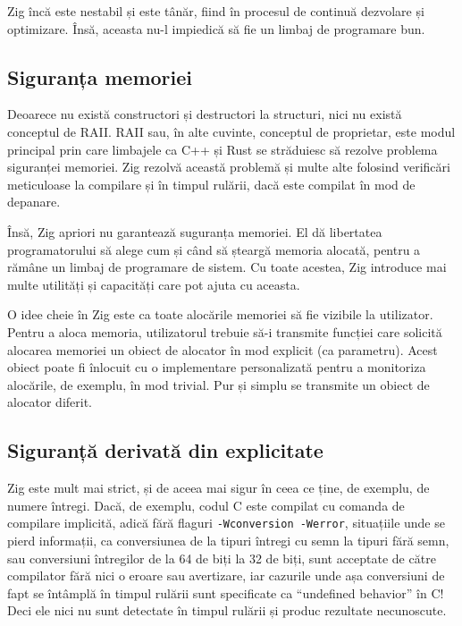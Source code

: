 \documentclass[a4paper,12pt]{report}
\begin{document}
Zig încă este nestabil și este tânăr, fiind în procesul de continuă dezvolare și optimizare.
Însă, aceasta nu-l impiedică să fie un limbaj de programare bun.

\subsection{Siguranța memoriei}

Deoarece nu există constructori și destructori la structuri,
nici nu există conceptul de \ac{RAII}.
\ac{RAII} sau, în alte cuvinte, conceptul de proprietar, este modul principal
prin care limbajele ca C++ și Rust se străduiesc să rezolve problema siguranței memoriei.
Zig rezolvă această problemă și multe alte folosind verificări meticuloase
la compilare și în timpul rulării, dacă este compilat în mod de depanare.

Însă, Zig apriori nu garantează suguranța memoriei.
El dă libertatea programatorului să alege cum și când să șteargă memoria alocată,
pentru a rămâne un limbaj de programare de sistem.
Cu toate acestea, Zig introduce mai multe utilități și capacități care pot ajuta cu aceasta.

O idee cheie în Zig este ca toate alocările memoriei să fie vizibile la utilizator.
Pentru a aloca memoria, utilizatorul trebuie să-i transmite funcției care solicită alocarea memoriei
un obiect de alocator în mod explicit (ca parametru).
Acest obiect poate fi înlocuit cu o implementare personalizată
pentru a monitoriza alocările, de exemplu, în mod trivial.
Pur și simplu se transmite un obiect de alocator diferit.


\subsection{Siguranță derivată din explicitate}

Zig este mult mai strict, și de aceea mai sigur în ceea ce ține, de exemplu, de numere întregi.
Dacă, de exemplu, codul C este compilat cu comanda de compilare implicită,
adică fără flaguri \texttt{-Wconversion -Werror}, situațiile unde se pierd informații,
ca conversiunea de la tipuri întregi cu semn la tipuri fără semn, sau conversiuni întregilor
de la 64 de biți la 32 de biți, sunt acceptate de către compilator fără nici o eroare sau avertizare,
iar cazurile unde așa conversiuni de fapt se întâmplă în timpul rulării
sunt specificate ca ``undefined behavior'' în C!
Deci ele nici nu sunt detectate în timpul rulării și produc rezultate necunoscute.
\end{document}
